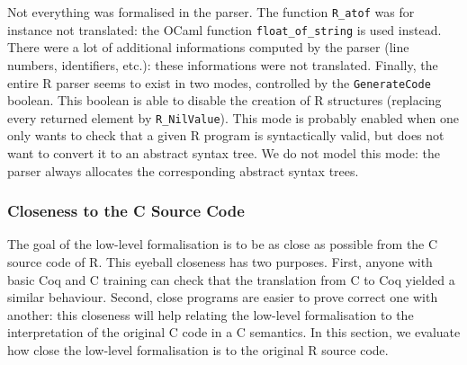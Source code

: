 \documentclass{article}
\newcommand\Coq{Coq}
\newcommand\OCaml{OCaml}
\newcommand\R{R}
\newcommand\Cn{C}
\begin{document}
Not everything was formalised in the parser.
The function \texttt{R_atof} was for instance not translated:
the \OCaml{} function \texttt{float_of_string}
is used instead.
There were a lot of additional informations computed by the parser
(line numbers, identifiers, etc.):
these informations were not translated.
Finally, the entire \R{} parser seems to exist in two modes,
controlled by the \texttt{GenerateCode} boolean.
This boolean is able to disable the creation of \R{} structures
(replacing every returned element by \texttt{R_NilValue}).
This mode is probably enabled when one only wants to check
that a given \R{} program is syntactically valid,
but does not want to convert it to an abstract syntax tree.
We do not model this mode:
the parser always allocates the corresponding abstract syntax trees.


\subsubsection{Closeness to the \Cn{} Source Code}
\label{sec:closeness}

The goal of the low-level formalisation is to be as close as possible
from the \Cn{} source code of \R{}.
This eyeball closeness has two purposes.
First, anyone with basic \Coq{} and \Cn{} training
can check that the translation from \Cn{} to \Coq{} yielded
a similar behaviour.
Second, close programs are easier to prove correct one with another:
this closeness will help relating the low-level formalisation
to the interpretation of the original \Cn{} code in a \Cn{} semantics.
In this section, we evaluate how close the low-level formalisation
is to the original \R{} source code.
\end{document}

